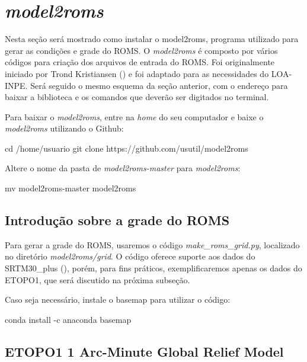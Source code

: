 \section{\textit{model2roms}}\label{model2romssec}
\bigskip

\noindent Nesta seção será mostrado como instalar o model2roms, programa utilizado para gerar as condições e grade do ROMS. O \textit{model2roms} é composto por vários códigos para criação dos arquivos de entrada do ROMS. Foi originalmente iniciado por Trond Kristiansen (\textcolor{bleu_cite}{\cite{Trond2019}}) e foi adaptado para as necessidades do LOA-INPE. Será seguido o mesmo esquema da seção anterior, com o endereço para baixar a biblioteca e os comandos que deverão ser digitados no terminal.
\bigskip

\noindent Para baixar o \textit{model2roms}, entre na \textit{home} do seu computador e baixe o \textit{model2roms} utilizando o Github:
\bigskip

\begin{bashcode}
cd /home/usuario
git clone https://github.com/usutil/model2roms
\end{bashcode}
\bigskip

\noindent Altere o nome da pasta de \textit{model2roms-master} para \textit{model2roms}:
\bigskip

\begin{bashcode}
mv model2roms-master model2roms
\end{bashcode}
\bigskip

\subsection{Introdução sobre a grade do ROMS}
\bigskip

\noindent Para gerar a grade do ROMS, usaremos o código \textit{make\_roms\_grid.py}, localizado no diretório \textit{model2roms/grid}.  O código oferece suporte aos dados do SRTM30\_plus (\cite{Becker2009}), porém, para fins práticos, exemplificaremos apenas os dados do ETOPO1, que será discutido na próxima subseção.
\bigskip

\noindent Caso seja necessário, instale o basemap para utilizar o código:
\bigskip

\begin{bashcode}
conda install -c anaconda basemap
\end{bashcode}
\bigskip

\subsection{ETOPO1 1 Arc-Minute Global Relief Model}
\bigskip

